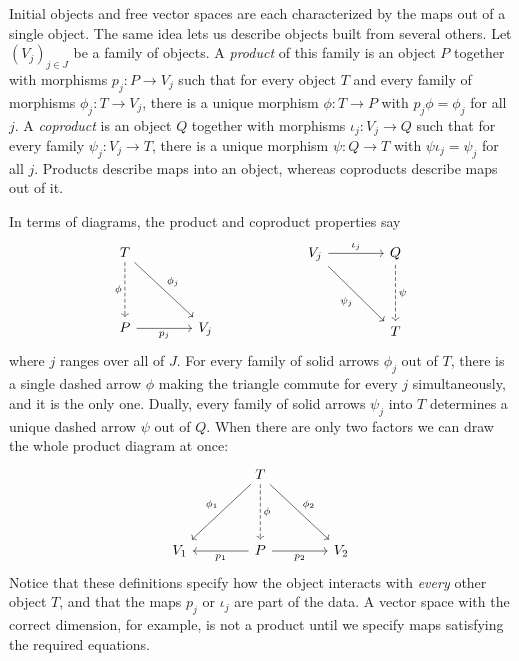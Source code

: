 \documentclass[12pt,reqno]{amsart}
\begin{document}
\hrulefill

Initial objects and free vector spaces are each characterized by the maps out of a single object. The same idea lets us describe objects built from several others. Let $(V_j)_{j\in J}$ be a family of objects. A \emph{product} of this family is an object $P$ together with morphisms $p_j:P\to V_j$ such that for every object $T$ and every family of morphisms $\phi_j:T\to V_j$, there is a unique morphism $\phi:T\to P$ with $p_j\phi=\phi_j$ for all $j$. A \emph{coproduct} is an object $Q$ together with morphisms $\iota_j:V_j\to Q$ such that for every family $\psi_j:V_j\to T$, there is a unique morphism $\psi:Q\to T$ with $\psi\iota_j=\psi_j$ for all $j$. Products describe maps into an object, whereas coproducts describe maps out of it.

In terms of diagrams, the product and coproduct properties say
\[
\begin{tikzcd}[row sep=4em,column sep=4em]
T \arrow[d,dashed,"\phi"'] \arrow[dr,"\phi_j"] & \\
P \arrow[r,"p_j"'] & V_j
\end{tikzcd}
\qquad\qquad\qquad
\begin{tikzcd}[row sep=4em,column sep=4em]
V_j \arrow[r,"\iota_j"] \arrow[dr,"\psi_j"'] & Q \arrow[d,dashed,"\psi"] \\
& T
\end{tikzcd}
\]
where $j$ ranges over all of $J$. For every family of solid arrows $\phi_j$ out of $T$, there is a single dashed arrow $\phi$ making the triangle commute for every $j$ simultaneously, and it is the only one. Dually, every family of solid arrows $\psi_j$ into $T$ determines a unique dashed arrow $\psi$ out of $Q$. When there are only two factors we can draw the whole product diagram at once:
\[
\begin{tikzcd}[row sep=4em,column sep=4em]
& T \arrow[dl,"\phi_1"'] \arrow[d,dashed,"\phi"] \arrow[dr,"\phi_2"] & \\
V_1 & P \arrow[l,"p_1"] \arrow[r,"p_2"'] & V_2
\end{tikzcd}
\]
Notice that these definitions specify how the object interacts with \emph{every} other object $T$, and that the maps $p_j$ or $\iota_j$ are part of the data. A vector space with the correct dimension, for example, is not a product until we specify maps satisfying the required equations.
\end{document}
